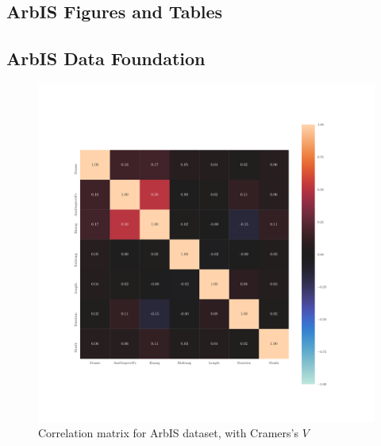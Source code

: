 \documentclass[a4paper,headsepline,footsepline,fontsize=11pt,BCOR=12mm,DIV=12]{report}
\newcommand{\nocontentsline}[3]{}
\newcommand{\tocless}[2]{\bgroup\let\addcontentsline=\nocontentsline#1{#2}\egroup}
\begin{document}
\begin{appendices}
\chapter{ArbIS Figures and Tables}
\label{appendix_arbis}
\tocless\section{ArbIS Data Foundation}
\label{appendix_arbis_dataset}


\begin{figure}[h]
	\centering
	\includegraphics[scale=0.7, trim=0cm 2cm 0cm 0cm]{../CorrAnalysis/data/ArbIS/01_dataset/plots/arbis_dataset_corr_cramers}
	\caption{Correlation matrix for ArbIS dataset, with Cramers's $V$}
	\label{img:appendix_arbis_correlation_matrix_dataset_cramers}
\end{figure}
\restoregeometry


\end{appendices}
\end{document}
